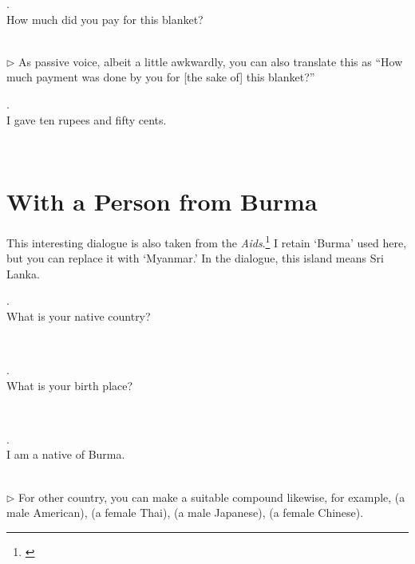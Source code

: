 \medskip
\parbox[lt]{0.93\linewidth}{\raggedright{}. \\
\hspace*{6mm}How much did you pay for this blanket?}\\[1mm]
{\small $\triangleright$ As passive voice, albeit a little awkwardly, you can also translate this as ``How much payment was done by you for [the sake of] this blanket?''}

\medskip
\parbox[lt]{0.93\linewidth}{\raggedright{}. \\
\hspace*{6mm}I gave ten rupees and fifty cents.}\\[1mm]

{}
\section*{With a Person from Burma}

This interesting dialogue is also taken from the \emph{Aids}.\footnote{\citealp[pp.~79--82]{buddhadatta:aids}} I retain `Burma' used here, but you can replace it with `Myanmar.' In the dialogue, this island means Sri Lanka.

\medskip
\parbox[lt]{0.93\linewidth}{\raggedright{}. \\
\hspace*{6mm}What is your native country?}\\[1mm]

\medskip
\parbox[lt]{0.93\linewidth}{\raggedright{}. \\
\hspace*{6mm}What is your birth place?}\\[1mm]

\medskip
\parbox[lt]{0.93\linewidth}{\raggedright{}. \\
\hspace*{6mm}I am a native of Burma.}\\[1mm]
{\small $\triangleright$ For other country, you can make a suitable compound likewise, for example,  (a male American),  (a female Thai),  (a male Japanese),  (a female Chinese).}

